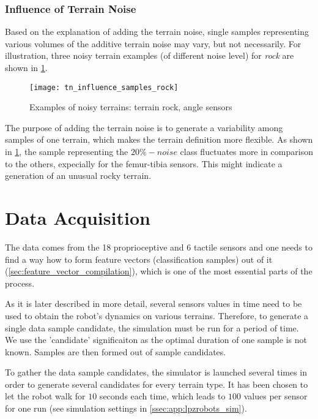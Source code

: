 \subsubsection*{Influence of Terrain Noise} \label{sssec:terrain_noise_influence}
Based on the explanation of adding the terrain noise, single samples representing various volumes of the additive terrain noise may vary, but not necessarily. For illustration, three noisy terrain examples (of different noise level) for \textit{rock} are shown in \cref{fig:tn_influence_samples_rock}.

\begin{figure}[H]
  \centering
  \texttt{[image: tn\_influence\_samples\_rock]}
  \caption{Examples of noisy terrains: terrain rock, angle sensors}
  \label{fig:tn_influence_samples_rock}
\end{figure}

The purpose of adding the terrain noise is to generate a variability among samples of one terrain, which makes the terrain definition more flexible. As shown in \cref{fig:tn_influence_samples_rock}, the sample representing the $ 20\%-noise $ class fluctuates more in comparison to the others, expecially for the femur-tibia sensors. This might indicate a generation of an unusual rocky terrain.

\section{Data Acquisition} \label{sec:data_acquisition}
The data comes from the 18 proprioceptive and 6 tactile sensors and one needs to find a way how to form feature vectors (classification samples) out of it (\cref{sec:feature_vector_compilation}), which is one of the most essential parts of the process.

As it is later described in more detail, several sensors values in time need to be used to obtain the robot's dynamics on various terrains. Therefore, to generate a single data sample candidate, the simulation must be run for a period of time. We use the 'candidate' significaiton as the optimal duration of one sample is not known. Samples are then formed out of sample candidates.

To gather the data sample candidates, the simulator is launched several times in order to generate several candidates for every terrain type. It has been chosen to let the robot walk for $ 10 $ seconds each time, which leads to $ 100 $ values per sensor for one run (see simulation settings in \cref{ssec:app:lpzrobots_sim}).

